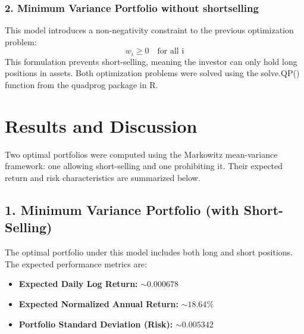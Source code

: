 \documentclass[12pt]{article}
\begin{document}
\subsubsection*{2. Minimum Variance Portfolio without shortselling}
This model introduces a non-negativity constraint to the previous optimization problem:
\[w_i \geq 0 \quad \text{for all i}\]
This formulation prevents short-selling, meaning the investor can only hold long positions in assets.\newline
Both optimization problems were solved using the solve.QP() function from the quadprog package in R.

\section{Results and Discussion}
Two optimal portfolios were computed using the Markowitz mean-variance framework: one allowing short-selling and one prohibiting it. Their expected return and risk characteristics are summarized below.
\subsection*{1. Minimum Variance Portfolio (with Short-Selling)}
The optimal portfolio under this model includes both long and short positions. The expected performance metrics are:
\begin{itemize}
    \item \textbf{Expected Daily Log Return:} $\sim 0.000678$
    \item \textbf{Expected Normalized Annual Return:} $\sim 18.64\%$
    \item \textbf{Portfolio Standard Deviation (Risk):} $\sim 0.005342$
\end{itemize}
\end{document}
